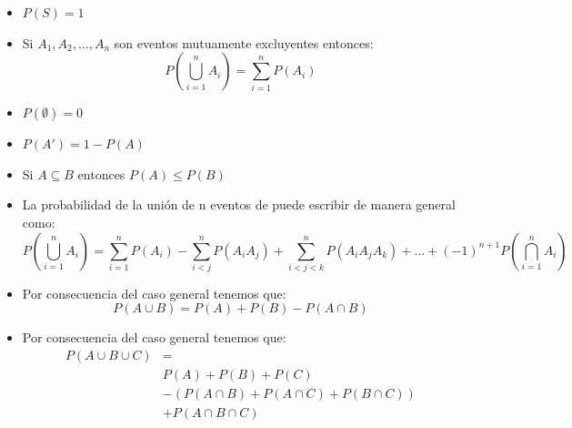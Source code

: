 \documentclass[12pt, fleqn]{report}                             %
\theoremstyle{break}                                            %
\newcommand{\Wrap}[1]           {\left( #1 \right)}             %
\begin{document}
                \begin{itemize}
                    \item
                        $P(S) = 1$
                    
                    \item
                        Si $A_1, A_2, \dots, A_n$ son eventos mutuamente excluyentes entonces:
                        \begin{equation*}
                            P\Wrap{\bigcup_{i = 1}^n A_i} 
                                = \sum_{i = 1}^n P(A_i)    
                        \end{equation*}
                    
                    \item 
                        $P(\emptyset) = 0$
                    
                    \item 
                        $P(A') = 1 - P(A)$

                    \item 
                        Si $A \subseteq B$ entonces $P(A) \leq P(B)$

                    \item
                        La probabilidad de la unión de n eventos de puede escribir de manera general como:
                        \begin{equation*}
                            P\Wrap{\bigcup_{i = 1}^n A_i} 
                            = 
                                \sum_{i = 1}^n P(A_i) 
                                - \sum_{i < j}^n P(A_iA_j) 
                                + \sum_{i < j < k}^n P(A_iA_jA_k)
                                + \dots
                                + (-1)^{n+1} P\Wrap{\bigcap_{i = 1}^n A_i}
                        \end{equation*}
                    
                    \item Por consecuencia del caso general tenemos que: 
                        \begin{equation*}
                            P(A \cup B) = P(A) + P(B) - P(A \cap B)   
                        \end{equation*}
                    
                    \item Por consecuencia del caso general tenemos que: 
                        \begin{align*}
                            P(A \cup B \cup C) 
                                &=                                              \\
                                &P(A) + P(B) + P(C)                             \\
                                &-(P(A \cap B) + P(A \cap C) + P(B \cap C))     \\
                                &+ P(A \cap B \cap C)   
                        \end{align*}


\end{itemize}
\end{document}
